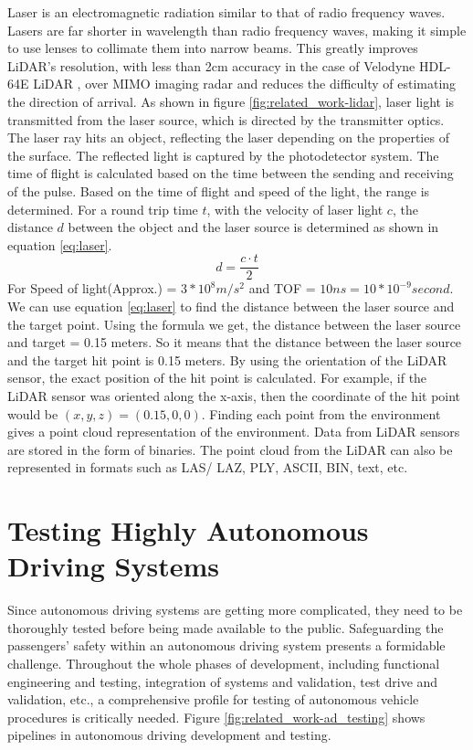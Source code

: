 Laser is an electromagnetic radiation similar to that of radio frequency waves. Lasers are far shorter in wavelength than radio frequency waves, making it simple to use lenses to collimate them into narrow beams. This greatly improves LiDAR's resolution, with less than 2cm accuracy in the case of Velodyne HDL-64E LiDAR \parencite{velodyne_64}, over MIMO imaging radar and reduces the difficulty of estimating the direction of arrival. As shown in figure \ref{fig:related_work-lidar}, laser light is transmitted from the laser source, which is directed by the transmitter optics. The laser ray hits an object, reflecting the laser depending on the properties of the surface. The reflected light is captured by the photodetector system. The time of flight is calculated based on the time between the sending and receiving of the pulse. Based on the time of flight and speed of the light, the range is determined. For a round trip time \(t\), with the velocity of laser light \(c\), the distance \(d\) between the object and the laser source is determined as shown in equation \ref{eq:laser}.
\begin{equation}\label{eq:laser}
    d = \frac{c \cdot t}{2}
\end{equation}
For Speed of light(Approx.) = \(3 * 10^8 m/s^2\) and TOF = \(10 ns = 10 * 10^{-9} second\). We can use equation \ref{eq:laser} to find the distance between the laser source and the target point. Using the formula we get, the distance between the laser source and target = 0.15 meters. So it means that the distance between the laser source and the target hit point is 0.15 meters. By using the orientation of the LiDAR sensor, the exact position of the hit point is calculated. For example, if the LiDAR sensor was oriented along the x-axis, then the coordinate of the hit point would be \((x, y, z) = (0.15, 0, 0)\). Finding each point from the environment gives a point cloud representation of the environment. Data from LiDAR sensors are stored in the form of binaries. The point cloud from the LiDAR can also be represented in formats such as LAS/ LAZ, PLY, ASCII, BIN, text, etc.

\section{Testing Highly Autonomous Driving Systems}
Since autonomous driving systems are getting more complicated, they need to be thoroughly tested before being made available to the public. Safeguarding the passengers' safety within an autonomous driving system presents a formidable challenge. Throughout the whole phases of development, including functional engineering and testing, integration of systems and validation, test drive and validation, etc., a comprehensive profile for testing of autonomous vehicle procedures is critically needed. Figure \ref{fig:related_work-ad_testing} shows pipelines in autonomous driving development and testing.

